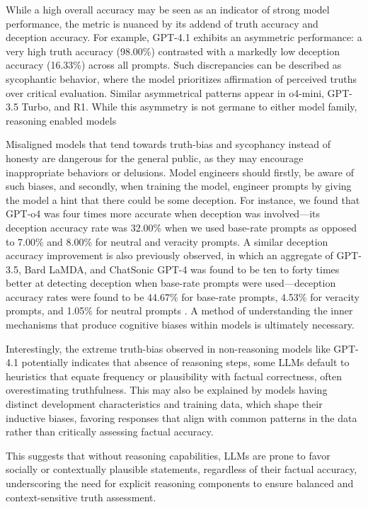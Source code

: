 \documentclass{article}
\begin{document}
While a high overall accuracy may be seen as an indicator of strong model performance, the metric is nuanced by its addend of truth accuracy and deception accuracy. For example, GPT-4.1 exhibits an asymmetric performance: a very high truth accuracy (98.00\%) contrasted with a markedly low deception accuracy (16.33\%) across all prompts. Such discrepancies can be described as sycophantic behavior, where the model prioritizes affirmation of perceived truths over critical evaluation. Similar asymmetrical patterns appear in o4-mini, GPT-3.5 Turbo, and R1. While this asymmetry is not germane to either model family, reasoning enabled models 

Misaligned models that tend towards truth-bias and sycophancy instead of honesty are dangerous for the general public, as they may encourage inappropriate behaviors or delusions. Model engineers should firstly, be aware of such biases, and secondly, when training the model, engineer prompts by giving the model a hint that there could be some deception. For instance, we found that GPT-o4 was four times more accurate when deception was involved---its deception accuracy rate was 32.00\% when we used base-rate prompts as opposed to 7.00\% and 8.00\% for neutral and veracity prompts. A similar deception accuracy improvement is also previously observed, in which an aggregate of GPT-3.5, Bard LaMDA, and ChatSonic GPT-4 was found to be ten to forty times better at detecting deception when base-rate prompts were used---deception accuracy rates were found to be 44.67\% for base-rate prompts, 4.53\% for veracity prompts, and 1.05\% for neutral prompts \citep{markowitz_generative_2024}. A method of understanding the inner mechanisms that produce cognitive biases within models is ultimately necessary.

Interestingly, the extreme truth-bias observed in non-reasoning models like GPT-4.1 potentially indicates that absence of reasoning steps, some LLMs default to heuristics that equate frequency or plausibility with factual correctness, often overestimating truthfulness. This may also be explained by models having distinct development characteristics and training data, which shape their inductive biases, favoring responses that align with common patterns in the data rather than critically assessing factual accuracy.

This suggests that without reasoning capabilities, LLMs are prone to favor socially or contextually plausible statements, regardless of their factual accuracy, underscoring the need for explicit reasoning components to ensure balanced and context-sensitive truth assessment.
\end{document}
